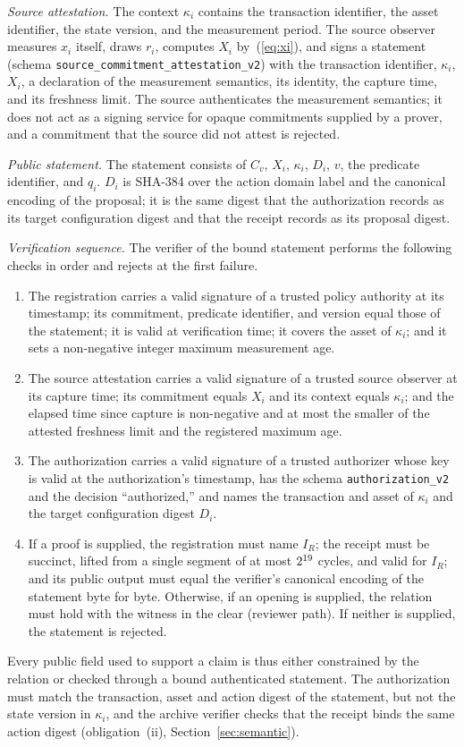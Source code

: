 \documentclass[journal]{IEEEtran}
\newcommand{\code}[1]{\texttt{\footnotesize #1}}
\begin{document}
\emph{Source attestation.} The context $\kappa_i$ contains the transaction identifier, the asset identifier, the state version, and the measurement period. The source observer measures $x_i$ itself, draws $r_i$, computes $X_i$ by~(\ref{eq:xi}), and signs a statement (schema \code{source\_commitment\_attestation\_v2}) with the transaction identifier, $\kappa_i$, $X_i$, a declaration of the measurement semantics, its identity, the capture time, and its freshness limit. The source authenticates the measurement semantics; it does not act as a signing service for opaque commitments supplied by a prover, and a commitment that the source did not attest is rejected.

\emph{Public statement.} The statement consists of $C_v$, $X_i$, $\kappa_i$, $D_i$, $v$, the predicate identifier, and $q_i$. $D_i$ is SHA-384 over the action domain label and the canonical encoding of the proposal; it is the same digest that the authorization records as its target configuration digest and that the receipt records as its proposal digest.

\emph{Verification sequence.} The verifier of the bound statement performs the following checks in order and rejects at the first failure.
\begin{enumerate}
\item The registration carries a valid signature of a trusted policy authority at its timestamp; its commitment, predicate identifier, and version equal those of the statement; it is valid at verification time; it covers the asset of $\kappa_i$; and it sets a non-negative integer maximum measurement age.
\item The source attestation carries a valid signature of a trusted source observer at its capture time; its commitment equals $X_i$ and its context equals $\kappa_i$; and the elapsed time since capture is non-negative and at most the smaller of the attested freshness limit and the registered maximum age.
\item The authorization carries a valid signature of a trusted authorizer whose key is valid at the authorization's timestamp, has the schema \code{authorization\_v2} and the decision ``authorized,'' and names the transaction and asset of $\kappa_i$ and the target configuration digest $D_i$.
\item If a proof is supplied, the registration must name $I_R$; the receipt must be succinct, lifted from a single segment of at most $2^{19}$ cycles, and valid for $I_R$; and its public output must equal the verifier's canonical encoding of the statement byte for byte. Otherwise, if an opening is supplied, the relation must hold with the witness in the clear (reviewer path). If neither is supplied, the statement is rejected.
\end{enumerate}
Every public field used to support a claim is thus either constrained by the relation or checked through a bound authenticated statement. The authorization must match the transaction, asset and action digest of the statement, but not the state version in $\kappa_i$, and the archive verifier checks that the receipt binds the same action digest (obligation~(ii), Section~\ref{sec:semantic}).
\end{document}
